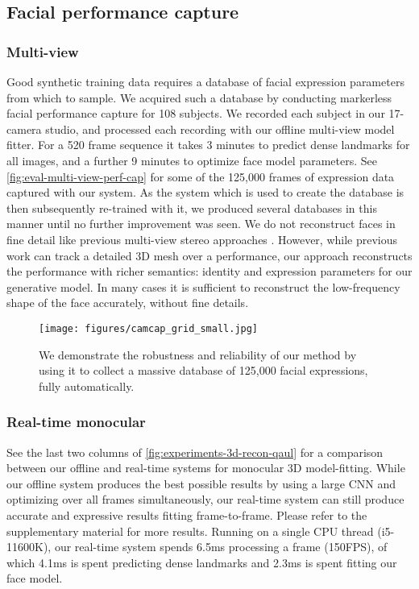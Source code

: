 \subsection{Facial performance capture}

\subsubsection{Multi-view}


Good synthetic training data requires a database of facial expression parameters from which to sample.
We acquired such a database by conducting markerless facial performance capture for 108 subjects.
We recorded each subject in our 17-camera studio, and processed each recording with our offline multi-view model fitter.
For a 520 frame sequence it takes 3 minutes to predict dense landmarks for all images, and a further 9 minutes to optimize face model parameters.
See \autoref{fig:eval-multi-view-perf-cap} for some of the 125,000 frames of expression data captured with our system.
As the system which is used to create the database is then subsequently re-trained with it, we
produced several databases in this manner until no further improvement was seen.
We do not reconstruct faces in fine detail like previous multi-view stereo approaches \cite{globallyConsistentReconstructionPopa, passiveFacialPerfCapture, anchorFramesPaper}.
However, while previous work can track a detailed 3D mesh over a performance, our approach reconstructs the performance with richer semantics: identity and expression parameters for our generative model.
In many cases it is sufficient to reconstruct the low-frequency shape of the face accurately, without fine details.

\begin{figure}[t]
    \texttt{[image: figures/camcap\_grid\_small.jpg]}\caption{We demonstrate the robustness and reliability of our method by using it to collect a massive database of 125,000 facial expressions, fully automatically.}
\label{fig:eval-multi-view-perf-cap}
\end{figure}

\subsubsection{Real-time monocular}

See the last two columns of \autoref{fig:experiments-3d-recon-qaul} for a comparison between our offline and real-time systems for monocular 3D model-fitting.
While our offline system produces the best possible results by using a large CNN and optimizing over all frames simultaneously,
our real-time system can still produce accurate and expressive results fitting frame-to-frame.
Please refer to the supplementary material for more results. Running on a single CPU thread (i5-11600K), our real-time system spends 6.5ms processing a frame (150FPS), of which 4.1ms is spent predicting dense landmarks and 2.3ms is spent fitting our face model.

